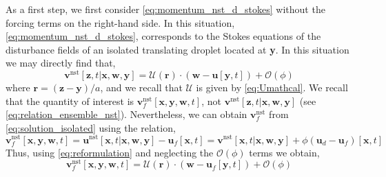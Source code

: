 As a first step, we first consider \ref{eq:momentum_nst_d_stokes} without the forcing terms on the right-hand side. 
In this situation, \ref{eq:momentum_nst_d_stokes}, corresponds to the Stokes equations of the disturbance fields of an isolated translating droplet located at \textbf{y}. 
In this situation we may directly find that, 
\begin{equation}
    \textbf{v}^\text{nst}[\textbf{z},t|\textbf{x},\textbf{w},\textbf{y}]
    = 
    \mathcal{U}(\textbf{r})
    \cdot
    (\textbf{w}- \textbf{u}[\textbf{y},t])
    + \mathcal{O}(\phi)
    \label{eq:solution_isolated}
\end{equation}
where $\textbf{r} = (\textbf{z} - \textbf{y})/a$, and we recall that $\mathcal{U}$ is given by \ref{eq:Umathcal}. 
We recall that the quantity of interest  is $\textbf{v}^\text{nst}_f[\textbf{x},\textbf{y},\textbf{w},t]$, not $\textbf{v}^\text{nst}[\textbf{z},t|\textbf{x},\textbf{w},\textbf{y}]$  (see \ref{eq:relation_ensemble_nst}). 
Nevertheless, we can obtain $\textbf{v}^\text{nst}_f$ from \ref{eq:solution_isolated} using the relation,
\begin{equation}
    \textbf{v}^\text{nst}_f[\textbf{x},\textbf{y},\textbf{w},t]
    = 
    \textbf{u}^\text{nst}[\textbf{x},t|\textbf{x},\textbf{w},\textbf{y}]
    - \textbf{u}_f[\textbf{x},t]
    = 
    \textbf{v}^\text{nst}[\textbf{x},t|\textbf{x},\textbf{w},\textbf{y}]
    + \phi(\textbf{u}_d - \textbf{u}_f)[\textbf{x},t]
    \label{eq:reformulation}
\end{equation}
Thus, using \ref{eq:reformulation} and neglecting the $\mathcal{O}(\phi)$ terms we obtain, 
\begin{equation}
    \textbf{v}^\text{nst}_f[\textbf{x},\textbf{y},\textbf{w},t]
    = 
    \mathcal{U}(\textbf{r})
    \cdot
    (\textbf{w}- \textbf{u}_f[\textbf{y},t])
    + \mathcal{O}(\phi)
    \label{eq:solution_isolated_at_x}
\end{equation}
